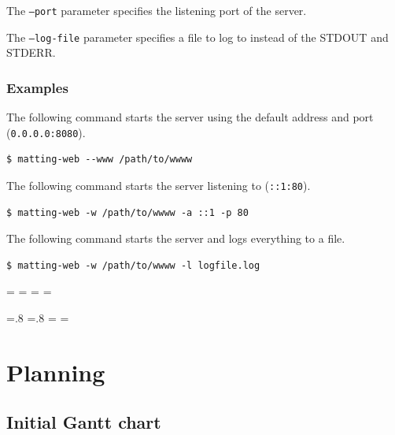 \documentclass[a4paper]{article}
\begin{document}
The \texttt{--port} parameter specifies the listening
port of the server.

The \texttt{--log-file} parameter specifies a file to log to instead of the
\textsc{STDOUT} and \textsc{STDERR}.

\subsubsection{Examples}

The following command starts the server using the default
address and port (\texttt{0.0.0.0:8080}).
\begin{lstlisting}[style=boxed]
    $ matting-web --www /path/to/wwww
\end{lstlisting}

The following command starts the server listening to
(\texttt{::1:80}).
\begin{lstlisting}[style=boxed]
    $ matting-web -w /path/to/wwww -a ::1 -p 80
\end{lstlisting}

The following command starts the server and logs everything to a file.
\begin{lstlisting}[style=boxed]
    $ matting-web -w /path/to/wwww -l logfile.log
\end{lstlisting}

\newlength{\mtL}

\setlength{\mtL}{.8\paperheight}%

\addtolength\mtL{-\headwidth}
\newpage
\addtolength\headwidth{\mtL}


\pdfpageheight=\paperwidth
\pdfpagewidth=\paperheight
\paperwidth=\pdfpagewidth
\paperheight=\pdfpageheight

\begingroup
\vsize=.8\pdfpageheight %
\hsize=.8\pdfpagewidth  %
\textwidth=\hsize
\textheight=\vsize


\section{Planning}

\subsection{Initial Gantt chart}
\end{document}
